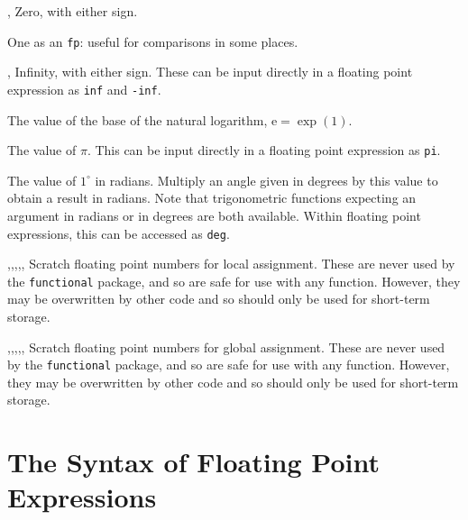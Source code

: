 \documentclass[oneside]{book}
\begin{document}
\begin{variable}{\cZeroFp, \cMinusZeroFp}
Zero, with either sign.
\end{variable}

\begin{variable}{\cOneFp}
One as an \texttt{fp}: useful for comparisons in some places.
\end{variable}

\begin{variable}{\cInfFp,\cMinusInfFp}
Infinity, with either sign. These can be input directly in a
floating point expression as \texttt{inf} and \texttt{-inf}.
\end{variable}

\begin{variable}{\cEFp}
The value of the base of the natural logarithm, $\mathrm{e} = \exp(1)$.
\end{variable}

\begin{variable}{\cPiFp}
The value of $\pi$.  This can be input directly in a floating point
expression as \texttt{pi}.
\end{variable}

\begin{variable}{\cOneDegreeFp}
The value of $1^{\circ}$ in radians. Multiply an angle given in
degrees by this value to obtain a result in radians.  Note that
trigonometric functions expecting an argument in radians or in
degrees are both available.  Within floating point expressions, this
can be accessed as \texttt{deg}.
\end{variable}

\begin{variable}{\lTmpaFp,\lTmpbFp,\lTmpcFp,\lTmpiFp,\lTmpjFp,\lTmpkFp}
Scratch floating point numbers for local assignment. These are never used by
the \verb!functional! package, and so are safe for use with any
function. However, they may be overwritten by other
code and so should only be used for short-term storage.
\end{variable}

\begin{variable}{\gTmpaFp,\gTmpbFp,\gTmpcFp,\gTmpiFp,\gTmpjFp,\gTmpkFp}
Scratch floating point numbers for global assignment. These are never used by
the \verb!functional! package, and so are safe for use with any
function. However, they may be overwritten by other
code and so should only be used for short-term storage.
\end{variable}

\section{The Syntax of Floating Point Expressions}
\end{document}
